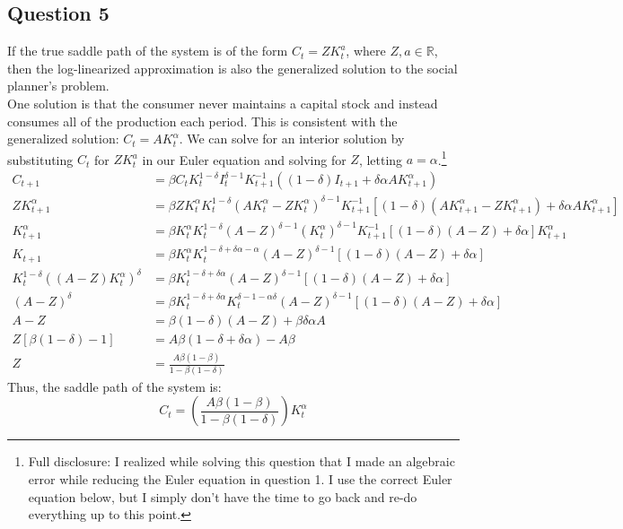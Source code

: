 \documentclass{article}
\newcommand{\R}{\mathbb{R}}
\begin{document}
\subsection*{Question 5}
If the true saddle path of the system is of the form ${C_t = ZK_t^a}$, where ${Z,a\in\R}$, then the log-linearized approximation is also the generalized solution to the social planner's problem. 
\medskip \\
One solution is that the consumer never maintains a capital stock and instead consumes all of the production each period. This is consistent with the generalized solution: ${C_t = AK_t^\alpha}$. We can solve for an interior solution by substituting $C_t$ for $ZK_t^a$ in our Euler equation and solving for $Z$, letting ${a=\alpha}$.\footnote{Full disclosure: I realized while solving this question that I made an algebraic error while reducing the Euler equation in question 1. I use the correct Euler equation below, but I simply don't have the time to go back and re-do everything up to this point.}
{\small
\begin{align*}
	C_{t+1} 		&= \beta C_tK_t^{1-\delta}I_t^{\delta-1}K_{t+1}^{-1}\left((1-\delta)I_{t+1} + \delta\alpha AK_{t+1}^\alpha\right)	\\
	ZK_{t+1}^\alpha &= \beta ZK_t^\alpha K_t^{1-\delta}\left(AK_t^\alpha - ZK_t^\alpha\right)^{\delta-1}K_{t+1}^{-1}
							\left[(1-\delta)\left(AK_{t+1}^\alpha - ZK_{t+1}^\alpha\right) + \delta\alpha AK_{t+1}^\alpha\right]		\\
	K_{t+1}^\alpha 	&= \beta K_t^\alpha K_t^{1-\delta}(A-Z)^{\delta-1}\left(K_t^\alpha\right)^{\delta-1}K_{t+1}^{-1}
							\left[(1-\delta)(A-Z)+ \delta\alpha\right]K_{t+1}^\alpha 													\\
	K_{t+1}			&= \beta K_t^\alpha K_t^{1-\delta +\delta\alpha-\alpha}(A-Z)^{\delta-1}\left[(1-\delta)(A-Z)+ \delta\alpha\right]	\\
	K_t^{1-\delta}\left((A-Z)K_t^\alpha\right)^\delta 
					&= \beta K_t^{1-\delta +\delta\alpha}(A-Z)^{\delta-1}\left[(1-\delta)(A-Z)+ \delta\alpha\right]						\\
	(A-Z)^\delta	&= \beta K_t^{1-\delta +\delta\alpha}K_t^{\delta-1-\alpha\delta}(A-Z)^{\delta-1}
							\left[(1-\delta)(A-Z)+ \delta\alpha\right]																	\\
	A-Z				&= \beta(1-\delta)(A-Z) + \beta\delta\alpha A																		\\
	Z\left[\beta(1-\delta)-1\right]
					&= A\beta(1-\delta+\delta\alpha)-A\beta																				\\
				Z 	&= \frac{A\beta(1-\beta)}{1-\beta(1-\delta)}
\end{align*}
}
Thus, the saddle path of the system is:
\[
	C_t = \left(\frac{A\beta(1-\beta)}{1-\beta(1-\delta)}\right)K_t^\alpha
\]
\end{document}
